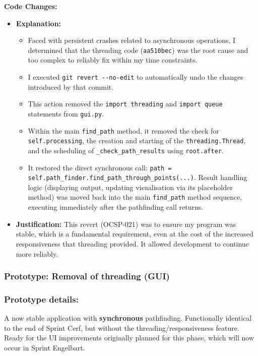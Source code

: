 	\textbf{Code Changes:}
	\begin{itemize}
		\item \textbf{Explanation:}
		\begin{itemize}
			\item Faced with persistent crashes related to asynchronous operations, I determined that the threading code (\verb|aa510bec|) was the root cause and too complex to reliably fix within my time constraints.
			\item I executed \verb|git revert --no-edit| to automatically undo the changes introduced by that commit.
			\item This action removed the \verb|import threading| and \verb|import queue| statements from \verb|gui.py|.
			\item Within the main \verb|find_path| method, it removed the check for \verb|self.processing|, the creation and starting of the \verb|threading.Thread|, and the scheduling of \verb|_check_path_results| using \verb|root.after|.
			\item It restored the direct synchronous call: \verb|path = self.path_finder.find_path_through_points(...)|. Result handling logic (displaying output, updating visualisation via its placeholder method) was moved back into the main \verb|find_path| method sequence, executing immediately after the pathfinding call returns.
		\end{itemize}
		\item \textbf{Justification:} This revert (OCSP-021) was to ensure my program was stable, which is a fundamental requirement, even at the cost of the increased responsiveness that threading provided. It allowed development to continue more reliably.
	\end{itemize}
	
\subsubsection*{Prototype: Removal of threading (GUI)}



\subsubsection{Prototype details:}
A now stable application with \textbf{synchronous} pathfinding. Functionally identical to the end of Sprint Cerf, but without the threading/responsiveness feature. Ready for the UI improvements originally planned for this phase, which will now occur in Sprint Engelbart.

